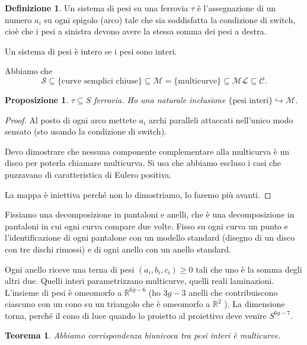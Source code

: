 \documentclass[a4paper]{article}
\newtheorem{theorem}{Teorema}
\newtheorem{proposition}{Proposizione}
\theoremstyle{definition}
\newtheorem{definition}{Definizione}
\begin{document}
    \begin{definition}
        Un sistema di pesi su una ferrovia $\tau$ è l'assegnazione di un numero $a_i$ su ogni spigolo (arco) tale che sia soddisfatta la condizione di switch, cioè che i pesi a sinistra devono avere la stessa somma dei pesi a destra.

        Un sistema di pesi è intero se i pesi sono interi.
    \end{definition}

    Abbiamo che \[
        \mathcal S \subseteq \{\mbox{curve semplici chiuse}\} \subseteq \mathcal M = \{\mbox{multicurve}\} \subseteq \mathcal{ML} \subseteq \mathcal C.
    \]
    \begin{proposition}
        $\tau\subseteq S$ ferrovia. Ho una naturale inclusione $\{\mbox{pesi interi}\} \hookrightarrow \mathcal M$.
    \end{proposition}

    \begin{proof}
        Al posto di ogni arco mettete $a_i$ archi paralleli attaccati nell'unico modo sensato (sto usando la condizione di switch).

        Devo dimostrare che nessuna componente complementare alla multicurva è un disco per poterla chiamare multicurva. Si usa che abbiamo escluso i casi che puzzavano di caratteristica di Eulero positiva.

        La mappa è iniettiva perché non lo dimostriamo, lo faremo più avanti.
    \end{proof} 

    Fissiamo una decomposizione in pantaloni e anelli, che è una decomposizione in pantaloni in cui ogni curva compare due volte. Fisso su ogni curva un punto e l'identificazione di ogni pantalone con un modello standard (disegno di un disco con tre dischi rimossi) e di ogni anello con un anello standard.

    Ogni anello riceve una terna di pesi $(a_i, b_i, c_i) \geq 0$ tali che uno è la somma degli altri due. Quelli interi parametrizzano multicurve, quelli reali laminazioni.
    L'insieme di pesi è omeomorfo a $\mathbb R^{6 g - 6}$ (ho $3 g - 3$ anelli che contribuiscono ciascuno con un cono su un triangolo che è omeomorfo a $\mathbb R^2$ ). La dimensione torna, perché il cono di luce quando lo proietto al proiettivo deve venire $S^{6 g - 7}$.
     
    \begin{theorem}
        Abbiamo corrispondenza biunivoca tra pesi interi è multicurve.
    \end{theorem}
\end{document}
